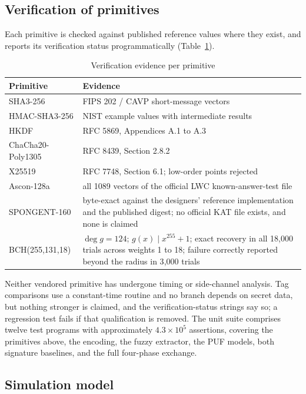 \documentclass[journal]{IEEEtran}
\begin{document}
\subsection{Verification of primitives}

Each primitive is checked against published reference values where they exist,
and reports its verification status programmatically (Table~\ref{tab:kat}).

\begin{table}[H]
\centering
\caption{Verification evidence per primitive}
\label{tab:kat}
\scriptsize
\setlength{\tabcolsep}{2.2pt}
\begin{tabular}{@{}p{2.5cm}p{6.1cm}@{}}
\toprule
\textbf{Primitive} & \textbf{Evidence} \\
\midrule
SHA3-256 & FIPS 202 / CAVP short-message vectors \\
HMAC-SHA3-256 & NIST example values with intermediate results \\
HKDF & RFC 5869, Appendices A.1 to A.3 \\
ChaCha20-Poly1305 & RFC 8439, Section 2.8.2 \\
X25519 & RFC 7748, Section 6.1; low-order points rejected \\
Ascon-128a & all 1089 vectors of the official LWC known-answer-test file \\
SPONGENT-160 & byte-exact against the designers' reference implementation and the
published digest; no official KAT file exists, and none is claimed \\
BCH(255,131,18) & $\deg g = 124$; $g(x) \mid x^{255}+1$; exact recovery in all
18{,}000 trials across weights 1 to 18; failure correctly reported beyond the
radius in 3{,}000 trials \\
\bottomrule
\end{tabular}
\end{table}

Neither vendored primitive has undergone timing or side-channel analysis. Tag
comparisons use a constant-time routine and no branch depends on secret data,
but nothing stronger is claimed, and the verification-status strings say so; a
regression test fails if that qualification is removed. The unit suite
comprises twelve test programs with approximately $4.3\times10^{5}$ assertions,
covering the primitives above, the encoding, the fuzzy extractor, the PUF
models, both signature baselines, and the full four-phase exchange.

\subsection{Simulation model}
\label{sec:impl-sim}
\end{document}
